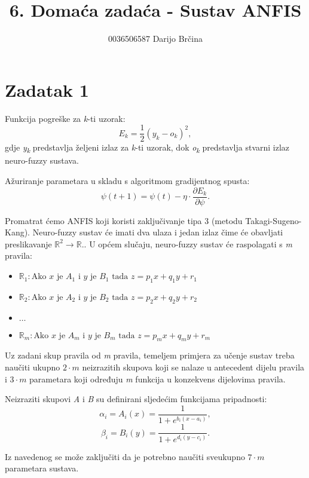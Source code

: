 \documentclass[times, utf8, seminar]{fer}
\begin{document}
\title{6. Domaća zadaća - Sustav ANFIS }
\author{0036506587 Darijo Brčina}

\maketitle

\tableofcontents

\chapter{Zadatak 1}
Funkcija pogreške za \textit{k}-ti uzorak:
\[E_k = \frac{1}{2}(y_k-o_k)^2,\]
gdje \textit{y\textsubscript{k}} predstavlja željeni izlaz za \textit{k}-ti uzorak, dok \textit{o\textsubscript{k}} predstavlja stvarni izlaz neuro-fuzzy sustava.


Ažuriranje parametara u skladu s algoritmom gradijentnog spusta:
\[\psi(t+1) = \psi(t) - \eta \cdot \frac{\partial E_k}{\partial \psi}.\]

Promatrat ćemo ANFIS koji koristi zaključivanje tipa 3 (metodu Takagi-Sugeno-Kang). Neuro-fuzzy sustav će imati dva ulaza i jedan izlaz čime će obavljati preslikavanje $\mathbb{R}^2 \rightarrow \mathbb{R}.$. U općem slučaju, neuro-fuzzy sustav će raspolagati s \textit{m} pravila:
\begin{itemize}
    \item[] $\mathbb{R}_1 : \text{Ako } x \text{ je } A_1 \text{ i } y \text{ je } B_1 \text{ tada } z = p_1x + q_1y + r_1$
    \item[] $\mathbb{R}_2 : \text{Ako } x \text{ je } A_2 \text{ i } y \text{ je } B_2 \text{ tada } z = p_2x + q_2y + r_2$
    \item[] $\dots$
    \item[] $\mathbb{R}_m : \text{Ako } x \text{ je } A_m \text{ i } y \text{ je } B_m \text{ tada } z = p_mx + q_my + r_m$
\end{itemize}
Uz zadani skup pravila od \textit{m} pravila, temeljem primjera za učenje sustav treba naučiti ukupno $2 \cdot m$ neizrazitih skupova koji se nalaze u antecedent dijelu pravila i $3 \cdot m$ parametara koji određuju \textit{m} funkcija u konzekvens dijelovima pravila.

Neizraziti skupovi \textit{A} i \textit{B} su definirani sljedećim funkcijama pripadnosti:
\[\alpha_i = A_i(x) = \frac{1}{1 + e^{b_i(x-a_i)}},\]
\[\beta_i = B_i(y) = \frac{1}{1 + e^{d_i(y-c_i)}}.\]


Iz navedenog se može zaključiti da je potrebno naučiti sveukupno $7 \cdot m$ parametara sustava.
\end{document}
